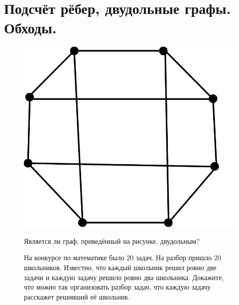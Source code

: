 
\section{Подсчёт рёбер, двудольные графы. Обходы.}

\begin{figure}[H]
\begin{minipage}{0.19\linewidth}
    \includegraphics[width=0.95\columnwidth]{img/10.4.0 img1.png}
\end{minipage}
    \hfill
\begin{minipage}{0.8\linewidth}
    \begin{thm}
        Является ли граф, приведённый на рисунке, двудольным?
    \end{thm}
    \begin{thm}
        На конкурсе по математике было 20 задач. На разбор пришло 20 школьников. Известно, что каждый школьник решил ровно две задачи и каждую задачу решило ровно два школьника. Докажите, что можно так организовать разбор задач, что каждую задачу расскажет решивший её школьник.
    \end{thm}
\end{minipage}
\end{figure}

